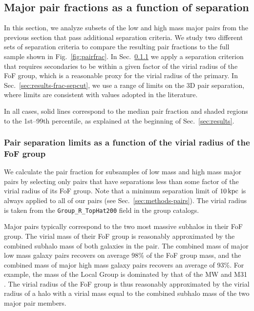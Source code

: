 \documentclass[twocolumn]{aastex631}
\begin{document}

\subsection{Major pair fractions as a function of separation}\label{sec:results-frac-cuts}
    In this section, we analyze subsets of the low and high mass major pairs from the previous section that pass additional separation criteria. 
    We study two different sets of separation criteria to compare the resulting pair fractions to the full sample shown in Fig.~\ref{fig:pairfrac}.
    In  Sec.~\ref{sec:results-frac-vircut} we apply a separation criterion that requires secondaries to be within a given factor of the virial radius of the FoF group, which is a reasonable proxy for the virial radius of the primary. 
    In Sec.~\ref{sec:results-frac-sepcut}, we use a range of limits on the 3D pair separation, where limits are consistent with values adopted in the literature. 
    
    In all cases, solid lines correspond to the median pair fraction and shaded regions to the 1st--99th percentile, as explained at the beginning of Sec.~\ref{sec:results}. 

\subsubsection{Pair separation limits as a function of the virial radius of the FoF group}\label{sec:results-frac-vircut}
    We calculate the pair fraction for subsamples of low mass and high mass major pairs by selecting only pairs that have separations less than some factor of the virial radius of its FoF group. 
    Note that a minimum separation limit of $10\mathrm{\,kpc}$ is always applied to all of our pairs (see Sec.~\ref{sec:methods-pairs}). 
    The virial radius is taken from the \texttt{Group\_R\_TopHat200} field in the group catalogs. 
   
    Major pairs typically correspond to the two most massive subhalos in their FoF group. 
    The virial mass of their FoF group is reasonably approximated by the combined subhalo mass of both galaxies in the pair.
    The combined mass of major low mass galaxy pairs recovers on average 98\% of the FoF group mass, and the combined mass of major high mass galaxy pairs recovers an average of 93\%. 
    For example, the mass of the Local Group is dominated by that of the MW and M31 \citep[e.g., ][]{Chamberlain2023}. 
    The virial radius of the FoF group is thus reasonably approximated by the virial radius of a halo with a virial mass equal to the combined subhalo mass of the two major pair members. %
    
\end{document}
